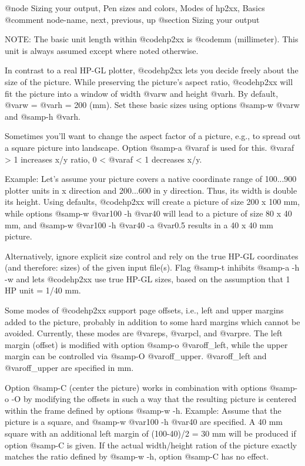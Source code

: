 @node Sizing your output, Pen sizes and colors, Modes of hp2xx, Basics
@comment  node-name,  next,  previous,  up
@section Sizing your output

NOTE: The basic unit length within @code{hp2xx} is @code{mm} (millimeter).
This unit is always assumed except where noted otherwise.

In contrast to a real HP-GL plotter, @code{hp2xx} lets you decide freely
about the size of the picture. While preserving the picture's aspect ratio,
@code{hp2xx} will fit the picture into a window of width @var{w} and
height @var{h}. By default, @var{w} = @var{h} = 200 (mm). Set these basic
sizes using options @samp{-w @var{w}} and @samp{-h @var{h}}.

Sometimes you'll want to change the aspect factor of a picture, e.g., to
spread out a square picture into landscape. Option @samp{-a @var{af}} is used
for this. @var{af} > 1 increases x/y ratio, 0 < @var{af} < 1 decreases x/y.

Example: Let's assume your picture covers a native coordinate range of
100...900 plotter units in x direction and 200...600 in y direction.
Thus, its width is double its height.
Using defaults, @code{hp2xx} will create a picture of size 200 x 100 mm,
while options @samp{-w @var{100} -h @var{40}} will lead to a picture of
size 80 x 40 mm, and @samp{-w @var{100} -h @var{40} -a @var{0.5}} results
in a 40 x 40 mm picture.

Alternatively, ignore explicit size control and rely on the true
HP-GL coordinates (and therefore: sizes) of the given input file(s).
Flag @samp{-t} inhibits @samp{-a -h -w} and lets @code{hp2xx} use true
HP-GL sizes, based on the assumption that 1 HP unit = 1/40 mm.

Some modes of @code{hp2xx} support page offsets, i.e., left
and upper margins added to the picture, probably in addition to some
hard margins which cannot be avoided. Currently, these modes are
@var{eps}, @var{pcl}, and @var{pre}. The left margin (offset) is modified
with option @samp{-o @var{off_left}}, while the upper margin can be
controlled via @samp{-O @var{off_upper}}. @var{off_left} and @var{off_upper}
are specified in mm.

Option @samp{-C} (center the picture) works in combination with options
@samp{-o -O} by modifying the offsets in such a way that the resulting
picture is centered within the frame defined by options @samp{-w -h}. Example:
Assume that the picture is a square, and @samp{-w @var{100} -h @var{40}}
are specified. A 40 mm square with an additional left margin of
(100-40)/2 = 30 mm will be produced if option @samp{-C} is given.
If the actual width/height ration of the picture exactly matches
the ratio defined by @samp{-w -h}, option @samp{-C} has no effect.



